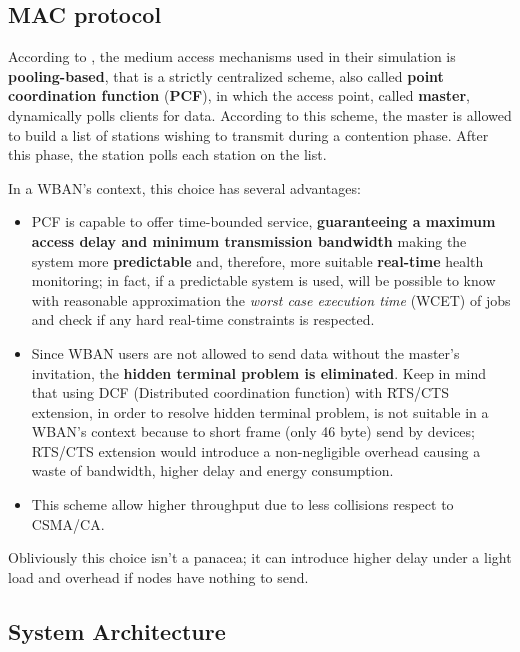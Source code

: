 \documentclass[sigchi]{acmart}
\begin{document}
\subsection{MAC protocol}

According to \citet{MSAReport}, the medium access mechanisms used in their simulation is \textbf{pooling-based}, that is a strictly centralized scheme, also called \textbf{point coordination function} (\textbf{PCF}), in which the access point, called \textbf{master}, dynamically polls clients for data. According to this scheme, the master is allowed to build a list of stations wishing to transmit during a contention phase. After this phase, the station polls each station on the list.

In a WBAN's context, this choice has several advantages:

\begin{itemize}

\item PCF is capable to offer time-bounded service, \textbf{guaranteeing a maximum access delay and minimum transmission bandwidth} making the system more \textbf{predictable} and, therefore, more suitable \textbf{real-time} health monitoring; in fact, if a predictable system is used, will be possible to know with reasonable approximation the \textit{worst case execution time} (WCET) of jobs and check if any hard real-time constraints is respected.

\item Since WBAN users are not allowed to send data without the master's invitation, the \textbf{hidden terminal problem is eliminated}. Keep in mind that using DCF (Distributed coordination function) with RTS/CTS extension, in order to resolve hidden terminal problem, is not suitable in a WBAN's context because to short frame (only 46 byte) send by devices; RTS/CTS extension would introduce a non-negligible overhead causing a waste of bandwidth, higher delay and energy consumption.

\item This scheme allow higher throughput due to less collisions respect to CSMA/CA.

\end{itemize}

Obliviously this choice isn't a panacea; it can introduce higher delay under a light load and overhead if nodes have nothing to send.

\subsection{System Architecture}
\end{document}
